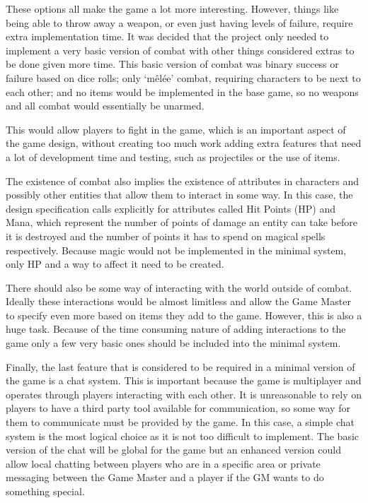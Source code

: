 These options all make the game a lot more interesting. However, things like being able to throw away a weapon, or even just having levels of failure, require extra implementation time. It was decided that the project only needed to implement a very basic version of combat with other things considered extras to be done given more time. This basic version of combat was binary success or failure based on dice rolls; only `mêlée' combat, requiring characters to be next to each other; and no items would be implemented in the base game, so no weapons and all combat would essentially be unarmed.

This would allow players to fight in the game, which is an important aspect of the game design, without creating too much work adding extra features that need a lot of development time and testing, such as projectiles or the use of items.

The existence of combat also implies the existence of attributes in characters and possibly other entities that allow them to interact in some way. In this case, the design specification calls explicitly for attributes called Hit Points (HP) and Mana, which represent the number of points of damage an entity can take before it is destroyed and the number of points it has to spend on magical spells respectively. Because magic would not be implemented in the minimal system, only HP and a way to affect it need to be created.

There should also be some way of interacting with the world outside of combat. Ideally these interactions would be almost limitless and allow the Game Master to specify even more based on items they add to the game. However, this is also a huge task. Because of the time consuming nature of adding interactions to the game only a few very basic ones should be included into the minimal system.

Finally, the last feature that is considered to be required in a minimal version of the game is a chat system. This is important because the game is multiplayer and operates through players interacting with each other. It is unreasonable to rely on players to have a third party tool available for communication, so some way for them to communicate must be provided by the game. In this case, a simple chat system is the most logical choice as it is not too difficult to implement. The basic version of the chat will be global for the game but an enhanced version could allow local chatting between players who are in a specific area or private messaging between the Game Master and a player if the GM wants to do something special.

